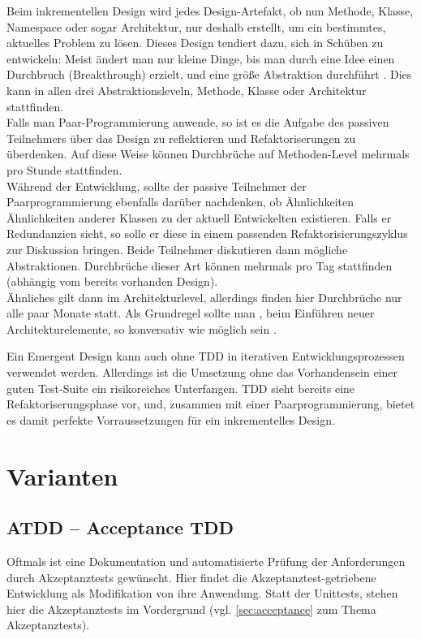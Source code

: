Beim inkrementellen Design wird jedes Design-Artefakt, ob nun Methode, Klasse, Namespace oder sogar Architektur, nur deshalb erstellt, um ein bestimmtes, aktuelles Problem zu lösen. Dieses Design tendiert dazu, sich in Schüben zu entwickeln: Meist ändert man nur kleine Dinge, bis man durch eine Idee einen Durchbruch (Breakthrough) erzielt, und eine größe Abstraktion durchführt\citep{shore_art_2007} \citep{evans_domain_driven_2003}. Dies kann in allen drei Abstraktionsleveln, Methode, Klasse oder Architektur stattfinden.\\
Falls man Paar-Programmierung anwende, so ist es die Aufgabe des passiven Teilnehmers über das Design zu reflektieren und Refaktoriserungen zu überdenken. Auf diese Weise können Durchbrüche auf Methoden-Level mehrmals pro Stunde stattfinden.\\
Während der Entwicklung, sollte der passive Teilnehmer der Paarprogrammierung ebenfalls darüber nachdenken, ob Ähnlichkeiten Ähnlichkeiten anderer Klassen zu der aktuell Entwickelten existieren. Falls er Redundanzien sieht, so solle er diese in einem passenden Refaktorisierungszyklus zur Diskussion bringen. Beide Teilnehmer diskutieren dann mögliche Abstraktionen. Durchbrüche dieser Art können mehrmals pro Tag stattfinden (abhängig vom bereits vorhanden Design).\\
Ähnliches gilt dann im Architekturlevel, allerdings finden hier Durchbrüche nur alle paar Monate statt. Als Grundregel sollte man , beim Einführen neuer Architekturelemente, so konversativ wie möglich sein \citep{shore_art_2007}.

Ein Emergent Design kann auch ohne TDD in iterativen Entwicklungsprozessen verwendet werden. Allerdings ist die Umsetzung ohne das Vorhandensein einer guten Test-Suite ein risikoreiches Unterfangen. TDD sieht bereits eine Refaktoriserungsphase vor, und, zusammen mit einer Paarprogrammierung, bietet es damit perfekte Vorraussetzungen für ein inkrementelles Design.

\section{Varianten}
\subsection{ATDD -- Acceptance TDD}
\label{sec:attd}

Oftmals ist eine Dokumentation und automatisierte Prüfung der Anforderungen durch Akzeptanztests gewünscht. Hier findet die Akzeptanztest-getriebene Entwicklung als Modifikation von  ihre Anwendung. Statt der Unittests, stehen hier die Akzeptanztests im Vordergrund (vgl. \ref{sec:acceptance} zum Thema Akzeptanztests).

